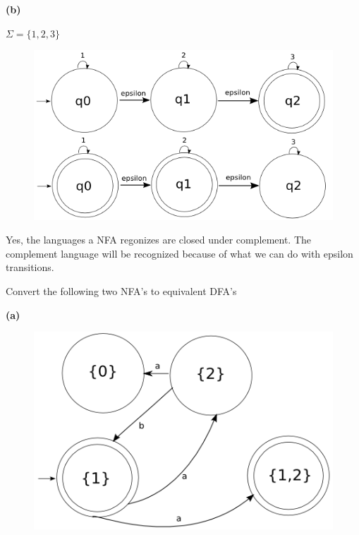 \documentclass[11pt]{article}
\newcommand{\question}[2] {\vspace{.25in} \fbox{#1} #2 \vspace{.10in}}
\renewcommand{\part}[1] {\vspace{.10in} {\bf (#1)}}
\begin{document}
\part{b}

$\Sigma = \{1,2,3\}$

\begin{figure}[h!]
  \begin{center}
    \includegraphics[scale=0.40]{8b.png}
  \end{center}
\end{figure}

Yes, the languages a NFA regonizes are closed under complement. 
The complement language will be recognized because of what we can do with epsilon transitions.

\pagebreak

\question{9}{Convert the following two NFA's to equivalent DFA's}

\part{a}

\begin{figure}[h!]
  \begin{center}
    \includegraphics[scale=0.40]{16a.png}
  \end{center}
\end{figure}
\end{document}
